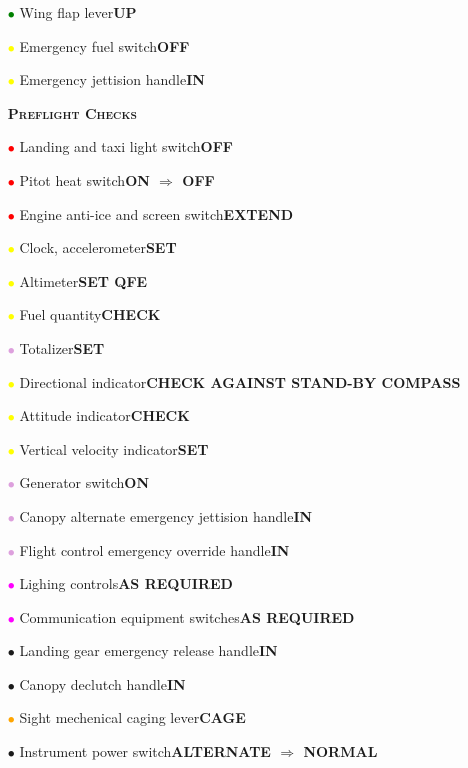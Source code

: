 \documentclass[a4paper,12pt,dvipsnames]{letter}
\newcommand{\button}[1]{\textbf{#1}}
\newcommand{\myHead}[1]{{\LARGE\textsc{\textbf{#1}}}}
\newcommand{\bi}{\textcolor{ProcessBlue}{$\bullet$\;}}
\newcommand{\ri}{\textcolor{Red}{$\bullet$\;}}
\newcommand{\gi}{\textcolor{Green}{$\bullet$\;}}
\newcommand{\yi}{\textcolor{Yellow}{$\bullet$\;}}
\newcommand{\vi}{\textcolor{Plum}{$\bullet$\;}}
\newcommand{\mi}{\textcolor{Magenta}{$\bullet$\;}}
\newcommand{\oi}{\textcolor{Orange}{$\bullet$\;}}
\newcommand{\ai}{\textcolor{Apricot}{$\bullet$\;}}
\begin{document}
{\begin{itemize}
\item[\gi] Wing flap lever\dotfill\button{UP}
\item[\yi] Emergency fuel switch\dotfill\button{OFF}
\item[\yi] Emergency jettision handle\dotfill\button{IN}
\end{itemize}
\newpage
\begin{itemize}
\item[] \myHead{Preflight Checks}
\item[\ri] Landing and taxi light switch\dotfill\button{OFF}
\item[\ri] Pitot heat switch\dotfill\button{ON $\Rightarrow$ OFF}
\item[\ri] Engine anti-ice and screen switch\dotfill\button{EXTEND}
\item[\yi] Clock, accelerometer\dotfill\button{SET}
\item[\yi] Altimeter\dotfill\button{SET QFE}
\item[\yi] Fuel quantity\dotfill\button{CHECK}
\item[\vi] Totalizer\dotfill\button{SET}
\item[\yi] Directional indicator\dotfill\button{CHECK AGAINST STAND-BY COMPASS}
\item[\yi] Attitude indicator\dotfill\button{CHECK}
\item[\yi] Vertical velocity indicator\dotfill\button{SET}
\item[\vi] Generator switch\dotfill\button{ON}
\item[\vi] Canopy alternate emergency jettision handle\dotfill\button{IN}
\item[\vi] Flight control emergency override handle\dotfill\button{IN}
\item[\mi] Lighing controls\dotfill\button{AS REQUIRED}
\item[\mi] Communication equipment switches\dotfill\button{AS REQUIRED}
\item[\bi] Landing gear emergency release handle\dotfill\button{IN}
\item[\bi] Canopy declutch handle\dotfill\button{IN}
\item[\oi] Sight mechenical caging lever\dotfill\button{CAGE}
\item[\ai] Instrument power switch\dotfill\button{ALTERNATE $\Rightarrow$ NORMAL}

\end{itemize}}
\end{document}
